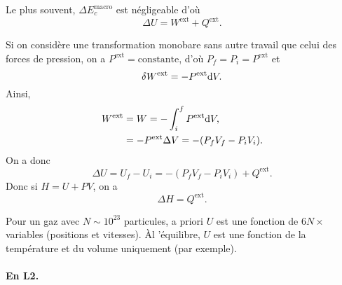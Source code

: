                 \begin{remark}
                    Le plus souvent, $\Delta E_c^{\text{macro}}$ est négligeable d'où
                    \begin{equation}
                        \boxed{
                            \Delta U=W^{\text{ext}}+Q^{\text{ext}}.
                        }
                    \end{equation}
                \end{remark}

                \begin{remark}
                    Si on considère une transformation monobare sans autre travail que celui des forces de pression, on a $P^{\text{ext}}=\mathrm{constante}$, d'où $P_f=P_i=P^{\text{ext}}$ et 
                    \begin{equation}
                        \delta W^{\text{ext}}=-P^{\text{ext}}\mathrm{d} V.
                    \end{equation}
                    Ainsi,
                    \begin{align}
                        W^{\text{ext}}
                        &=
                        W=-\int_{i}^{f}P^{\text{ext}}\mathrm{d} V,\\
                        &=
                        -P^{\text{ext}}\Delta V=-(P_f V_f-P_i V_i).
                    \end{align}
                    On a donc 
                    \begin{equation}
                        \Delta U=U_f-U_i=-(P_f V_f-P_i V_i)+Q^{\text{ext}}.
                    \end{equation}
                    Donc si $H=U+PV$, on a 
                    \begin{equation}
                        \boxed{
                            \Delta H=Q^{\text{ext}}.
                        }
                    \end{equation}
                \end{remark}

                \begin{example}
                    Pour un gaz avec $N\sim 10^{23}$ particules, a priori $U$ est une fonction de $6N\times $ variables (positions et vitesses). Àl 'équilibre, $U$ est une fonction de la température et du volume uniquement (par exemple).
                \end{example}

            \paragraph{En L2.}

